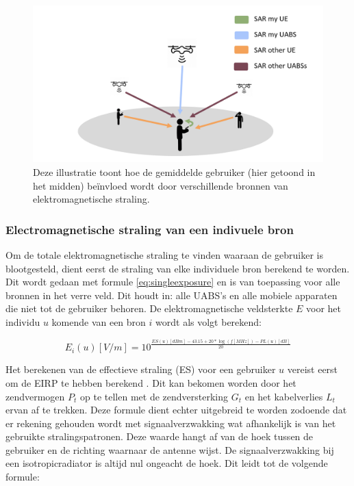 \documentclass[twocolumn]{phdsymp_dutch}
\begin{document}
\begin{figure}[h!]
\centering
  \includegraphics[width=\linewidth]{networkIllustrationSARSources.png}
  \caption{Deze illustratie toont hoe de gemiddelde gebruiker (hier getoond in het midden) be\"invloed wordt door verschillende bronnen van elektromagnetische straling.}
  \label{fig:netwerkIllustration}
\end{figure}

\subsubsection{Electromagnetische straling van een indivuele bron}
\label{sec:calculatingexposure}

Om de totale elektromagnetische straling te vinden waaraan de gebruiker is blootgesteld, dient eerst
de straling van elke individuele bron berekend te worden.
Dit wordt gedaan met formule  \ref{eq:singleexposure} en is van toepassing voor alle bronnen in het verre veld.
Dit houdt in: alle  \gls{UABS}'s en alle mobiele apparaten die niet tot de gebruiker behoren.
De elektromagnetische veldsterkte $E$ voor het individu $u$ komende van een bron $i$ wordt als volgt berekend:

\begin{equation}
E_i(u) [V/m] = 10^{\frac{ES(u)[dBm] - 43.15 + 20*\log(f [MHz])- PL(u) [dB]}{20}}
\label{eq:singleexposure}
\end{equation}

Het berekenen van de effectieve straling (ES) voor een gebruiker $u$ vereist eerst om de  \gls{EIRP} te hebben berekend 
 \cite{J6_originalExposureFormula,J1}. Dit kan bekomen worden door het zendvermogen $P_t$ op te tellen met de zendversterking $G_t$
 en het kabelverlies $L_t$ ervan af te trekken.
 Deze formule dient echter uitgebreid te worden zodoende dat er rekening gehouden wordt met signaalverzwakking wat afhankelijk is van 
 het gebruikte stralingspatronen. Deze waarde hangt af van de hoek tussen de gebruiker en de richting waarnaar de antenne wijst. 
 De signaalverzwakking bij een \gls{isotropicradiator} is altijd nul ongeacht de hoek.
 Dit leidt tot de volgende formule:
\end{document}
